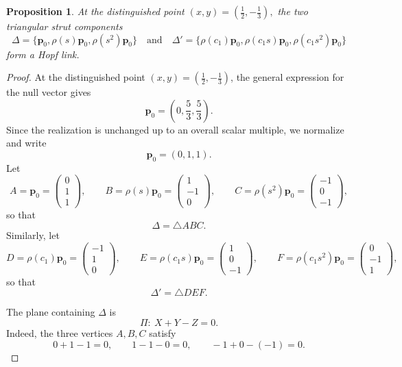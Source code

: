 \documentclass[12pt]{article}
\newtheorem{prop}{Proposition}
\begin{document}
\begin{prop}
\label{prop:onehopflink}
At the distinguished point
$
(x,y)=\left(\frac12,-\frac13\right),
$
the two triangular strut components
\[
\Delta=\{{\mathbf p}_0,\rho(s){\mathbf p}_0,\rho(s^2){\mathbf p}_0\}
\quad\text{and}\quad
\Delta'=\{\rho(c_1){\mathbf p}_0,\rho(c_1s){\mathbf p}_0,\rho(c_1s^2){\mathbf p}_0\}
\]
form a Hopf link.
\end{prop}
\begin{proof}
At the distinguished point \((x,y)=\left(\frac12,-\frac13\right)\), the general expression for the null vector gives
\[
{\mathbf p}_0=\left(0,\frac53,\frac53\right).
\]
Since the realization is unchanged up to an overall scalar multiple, we normalize and write
\[
{\mathbf p}_0=(0,1,1).
\]
Let
\[
A={\mathbf p}_0=
\begin{pmatrix}
0\\ 1\\ 1
\end{pmatrix},\qquad
B=\rho(s){\mathbf p}_0=
\begin{pmatrix}
1\\ -1\\ 0
\end{pmatrix},\qquad
C=\rho(s^2){\mathbf p}_0=
\begin{pmatrix}
-1\\ 0\\ -1
\end{pmatrix},
\]
so that
\[
\Delta=\triangle ABC.
\]
Similarly, let
\[
D=\rho(c_1){\mathbf p}_0=
\begin{pmatrix}
-1\\ 1\\ 0
\end{pmatrix},\qquad
E=\rho(c_1s){\mathbf p}_0=
\begin{pmatrix}
1\\ 0\\ -1
\end{pmatrix},\qquad
F=\rho(c_1s^2){\mathbf p}_0=
\begin{pmatrix}
0\\ -1\\ 1
\end{pmatrix},
\]
so that
\[
\Delta'=\triangle DEF.
\]

The plane containing \(\Delta\) is
\[
\Pi:\ X+Y-Z=0.
\]
Indeed, the three vertices \(A,B,C\) satisfy
\[
0+1-1=0,\qquad 1-1-0=0,\qquad -1+0-(-1)=0.
\]


\end{proof}
\end{document}
